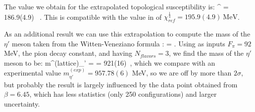 The value we obtain for the extrapolated topological susceptibility is:
\beq
    \chi^{} = 186.9(4.9)~ .
    \label{val:tops}
\eeq 
This is compatible with the value in \cite{shindler_nucleon_2015} of  $\chi^{\frac{1}{4}}_{ref} = 195.9(4.9)~\text{MeV} $. 

As an additional result we can use this extrapolation to compute the mass of the $\eta'$ meson taken from the Witten-Veneziano formula \cite{witten_current_1979}:
\beq
    \chi = .
\eeq 
Using as inputs $F_\pi = 92$ MeV, the pion decay constant, and having $N_{flavors} = 3$, we find the mass of the $\eta'$ meson to be:
\beq    
    m^{(lattice)}_{\eta'} =  = 921(16)~,
\eeq
which we compare with an experimental value  $m^{(exp)}_{\eta'} = 957.78(6)$ MeV, so we are off by more than $2\sigma$, but probably the result is largely influenced by the data point obtained from $\beta=6.45$, which has less statistics (only 250 configurations) and larger uncertainty.